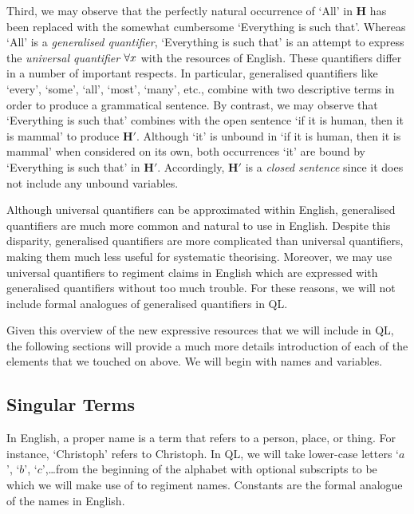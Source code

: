 Third, we may observe that the perfectly natural occurrence of `All' in \textbf{H} has been replaced with the somewhat cumbersome `Everything is such that'.
Whereas `All' is a \textit{generalised quantifier}, `Everything is such that' is an attempt to express the \textit{universal quantifier} $\forall x$ with the resources of English.
These quantifiers differ in a number of important respects.
In particular, generalised quantifiers like `every', `some', `all', `most', `many', etc., combine with two descriptive terms in order to produce a grammatical sentence.
By contrast, we may observe that `Everything is such that' combines with the open sentence `if it is human, then it is mammal' to produce \textbf{H$'$}.
Although `it' is unbound in `if it is human, then it is mammal' when considered on its own, both occurrences `it' are bound by `Everything is such that' in \textbf{H$'$}.
Accordingly, \textbf{H$'$} is a \textit{closed sentence} since it does not include any unbound variables.

Although universal quantifiers can be approximated within English, generalised quantifiers are much more common and natural to use in English.
Despite this disparity, generalised quantifiers are more complicated than universal quantifiers, making them much less useful for systematic theorising.
Moreover, we may use universal quantifiers to regiment claims in English which are expressed with generalised quantifiers without too much trouble. 
For these reasons, we will not include formal analogues of generalised quantifiers in QL.

Given this overview of the new expressive resources that we will include in QL, the following sections will provide a much more details introduction of each of the elements that we touched on above.
We will begin with names and variables.


\subsection{Singular Terms}

In English, a proper name is a term that refers to a person, place, or thing.
For instance, `Christoph' refers to Christoph.
In QL, we will take lower-case letters `$a$', `$b$', `$c$',\ldots from the beginning of the alphabet with optional subscripts to be  which we will make use of to regiment names.
Constants are the formal analogue of the names in English. 

